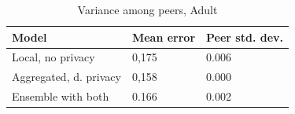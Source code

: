 \begin{table}[h]
	\centering
	\caption{Variance among peers, Adult}
	\label{table:peer_variance_adult}
	\begin{tabular}{|l|l|l|}
		\textbf{Model}                  & \textbf{Mean error} & \textbf{Peer std. dev.} \\
		\hline
		Local, no privacy      & 0,175 & 0.006 \\
		Aggregated, d. privacy & 0,158 & 0.000 \\
		Ensemble with both & 0.166 & 0.002 \\
	\end{tabular}
\end{table}      





\cleardoublepage